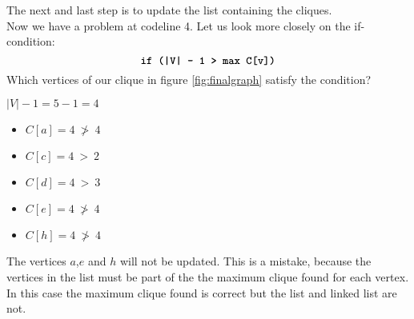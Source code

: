 \documentclass[12pt, xcolor=dvipsnames]{scrartcl}
\theoremstyle{definition}
\theoremstyle{definition}
\begin{document}
          The next and last step is to update the list containing the cliques.\\
          Now we have a problem at codeline 4. Let us look more closely on the if-condition:
          \[ \textbf{\texttt{if (|V| - 1 > max C[v])}} \]
          Which vertices of our clique in figure \ref{fig:finalgraph} satisfy the condition? 

          $|V| - 1 = 5 - 1 = 4$

          \begin{itemize}
            \item[\textcolor{red}{\textbullet}] $C[a] = 4 ~\ngtr~ 4$ 
            \item[\textcolor{Green}{\textbullet}] $C[c] = 4 ~>~ 2$
            \item[\textcolor{Green}{\textbullet}] $C[d] = 4 ~>~ 3$
            \item[\textcolor{red}{\textbullet}] $C[e] = 4 ~\ngtr~ 4$
            \item[\textcolor{red}{\textbullet}] $C[h] = 4 ~\ngtr~ 4$
          \end{itemize}

          The vertices $a$,$e$ and $h$ will not be updated. This is a mistake, because the vertices in the list must be part of the the maximum clique found for each vertex. In this case the maximum clique found is correct 
          but the list and linked list are not. 
\end{document}
